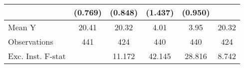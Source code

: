 {\begin{tabular}{l*{5}{c}}
            &     (0.769)         &     (0.848)         &     (1.437)         &     (0.950)         &                     \\
\midrule
Mean Y      &       20.41         &       20.32         &        4.01         &        3.95         &       20.32         \\
Observations&         441         &         424         &         440         &         440         &         424         \\
Exc. Inst. F-stat&                     &      11.172         &      42.145         &      28.816         &       8.742         \\
\bottomrule
\end{tabular}
}
